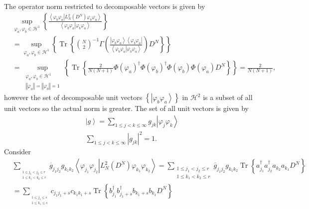 \documentclass[aps,preprint]{revtex4}%
\begin{document}
The operator norm restricted to decomposable vectors is given by
\begin{align}
&  \sup_{\varphi_{a},\varphi_{b}\in\mathcal{H}^{1}}\left\{  \frac{\left\langle
\left.  \varphi_{b}\varphi_{a}\right\vert L_{N}^{2}\left(  D^{N}\right)
\varphi_{b}\varphi_{a}\right\rangle }{\left\langle \left.  \varphi_{b}%
\varphi_{a}\right\vert \varphi_{b}\varphi_{a}\right\rangle }\right\}
\nonumber\\
&  \left.  =\right.  \sup_{\varphi_{a},\varphi_{b}\in\mathcal{H}^{1}}\left\{
\operatorname{Tr}\left\{  \binom{N}{2}^{-1}\Gamma\left(  \frac{\left\vert
\varphi_{b}\varphi_{a}\right\rangle \left\langle \varphi_{b}\varphi
_{a}\right\vert }{\left\langle \left.  \varphi_{b}\varphi_{a}\right\vert
\varphi_{b}\varphi_{a}\right\rangle }\right)  D^{N}\right\}  \right\}
\nonumber\\
&  \left.  =\right.  \sup_{\substack{\varphi_{a},\varphi_{b}\in\mathcal{H}%
^{1}\\\left\Vert \varphi_{a}\right\Vert =\left\Vert \varphi_{b}\right\Vert
=1}}\left\{  \operatorname{Tr}\left\{  \frac{2}{N\left(  N+1\right)  }%
\Phi\left(  \varphi_{a}\right)  ^{\dagger}\Phi\left(  \varphi_{b}\right)
^{\dagger}\Phi\left(  \varphi_{b}\right)  \Phi\left(  \varphi_{a}\right)
D^{N}\right\}  \right\}  =\frac{2}{N\left(  N+1\right)  },
\end{align}
however the set of decomposable unit vectors $\left\{  \left\vert \varphi
_{b}\varphi_{a}\right\rangle \right\}  $ in $\mathcal{H}^{2}$ is a subset of
all unit vectors so the actual norm is greater. The set of all unit vectors is
given by
\begin{align}
&  \left\vert g\right\rangle =\sum_{1\leq j<k\leq\infty}g_{jk}\left\vert
\varphi_{j}\varphi_{k}\right\rangle \\
&  \sum_{1\leq j<k\leq\infty}\left\vert g_{jk}\right\vert ^{2}=1.
\end{align}
Consider
\begin{align}
&  \sum_{_{\substack{1\leq j_{1}<j_{2}\leq r\\1\leq k_{1}<k_{2}\leq r}%
}}\overline{g}_{j_{1}j_{2}}g_{k_{1}k_{2}}\left\langle \left.  \varphi_{j_{1}%
}\varphi_{j_{2}}\right\vert L_{N}^{2}\left(  D^{N}\right)  \varphi_{k_{1}%
}\varphi_{k_{2}}\right\rangle =\sum_{\substack{1\leq j_{1}<j_{2}\leq r\\1\leq
k_{1}<k_{2}\leq r}}\overline{g}_{j_{1}j_{2}}g_{k_{1}k_{2}}\operatorname{Tr}%
\left\{  a_{j_{1}}^{\dagger}a_{j_{2}}^{\dagger}a_{k_{2}}a_{k_{1}}D^{N}\right\}
\\
&  =\sum_{_{\substack{1\leq j_{1}\leq s\\1\leq k_{1}\leq s}}}c_{j_{1}j_{1}%
+s}c_{k_{1}k_{1}+s}\operatorname{Tr}\left\{  b_{j_{1}}^{\dagger}b_{j_{1}%
+s}^{\dagger}b_{k_{1}+s}b_{k_{1}}D^{N}\right\}
\end{align}
\end{document}
